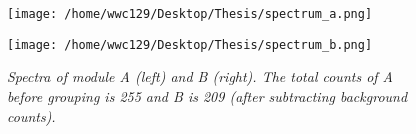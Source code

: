 \documentclass[12pt]{report}
\newcommand{\mycaption}[1]{\caption{\textit{\footnotesize #1}}}
\begin{document}
        
        \begin{figure}[!ht]
          \begin{minipage}[c]{0.45\textwidth}
            \begin{flushleft} 
                \texttt{[image: /home/wwc129/Desktop/Thesis/spectrum\_a.png]}
            \end{flushleft}
            \end{minipage}
          \begin{minipage}{0.45\textwidth}
            \begin{flushleft}
            \texttt{[image: /home/wwc129/Desktop/Thesis/spectrum\_b.png]}
            \end{flushleft}
          \end{minipage}
          \centering
          \begin{minipage}{0.8\textwidth}
          \mycaption{Spectra of module A (left) and B (right). The total counts of A before grouping is 
                      255 and B is 209 (after subtracting background counts).}
          \label{spectra}
          \end{minipage}
          \end{figure}
        













		
			

    
\end{document}
